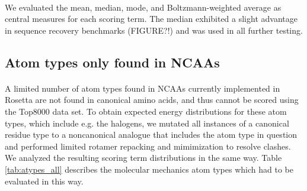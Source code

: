 \paragraph{}
We evaluated the mean, median, mode, and Boltzmann-weighted average as central measures for each scoring term.
The median exhibited a slight advantage in sequence recovery benchmarks (FIGURE?!) and was used in all further testing.

\subsection{Atom types only found in NCAAs} 
\paragraph{}
A limited number of atom types found in NCAAs currently implemented in Rosetta are not found in canonical amino acids, and thus cannot be scored using the Top8000 data set.
To obtain expected energy distributions for these atom types, which include e.g. the halogens, we mutated all instances of a canonical residue type to a noncanonical analogue that includes the atom type in question and performed limited rotamer repacking and mimimization to resolve clashes.
We analyzed the resulting scoring term distributions in the same way.
Table \ref{tab:atypes_all} describes the molecular mechanics atom types which had to be evaluated in this way.


